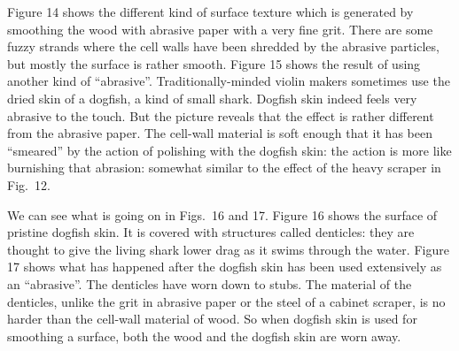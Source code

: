 

  Figure 14 shows the different kind of surface texture which is generated by 
  smoothing the wood with abrasive paper with a very fine grit. There are some 
  fuzzy strands where the cell walls have been shredded by the abrasive 
  particles, but mostly the surface is rather smooth. Figure 15 shows the 
  result of using another kind of “abrasive”. Traditionally-minded violin 
  makers sometimes use the dried skin of a dogfish, a kind of small shark. 
  Dogfish skin indeed feels very abrasive to the touch. But the picture reveals 
  that the effect is rather different from the abrasive paper. The cell-wall 
  material is soft enough that it has been “smeared” by the action of polishing 
  with the dogfish skin: the action is more like burnishing that abrasion: 
  somewhat similar to the effect of the heavy scraper in Fig.\ 12. 



  We can see what is going on in Figs.\ 16 and 17. Figure 16 shows the surface 
  of pristine dogfish skin. It is covered with structures called denticles: 
  they are thought to give the living shark lower drag as it swims through the 
  water. Figure 17 shows what has happened after the dogfish skin has been used 
  extensively as an “abrasive”. The denticles have worn down to stubs. The 
  material of the denticles, unlike the grit in abrasive paper or the steel of 
  a cabinet scraper, is no harder than the cell-wall material of wood. So when 
  dogfish skin is used for smoothing a surface, both the wood and the dogfish 
  skin are worn away. 


